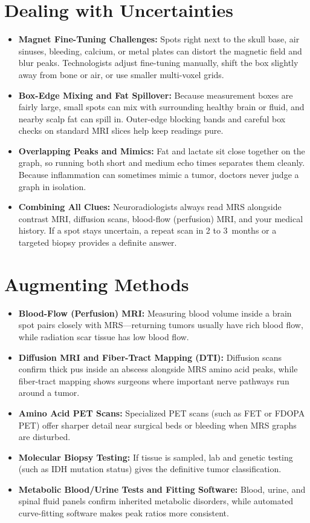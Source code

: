 \section{Dealing with Uncertainties}
\begin{itemize}
\item \textbf{Magnet Fine-Tuning Challenges:} Spots right next to the skull base, air sinuses, bleeding, calcium, or metal plates can distort the magnetic field and blur peaks. Technologists adjust fine-tuning manually, shift the box slightly away from bone or air, or use smaller multi-voxel grids.
\item \textbf{Box-Edge Mixing and Fat Spillover:} Because measurement boxes are fairly large, small spots can mix with surrounding healthy brain or fluid, and nearby scalp fat can spill in. Outer-edge blocking bands and careful box checks on standard MRI slices help keep readings pure.
\item \textbf{Overlapping Peaks and Mimics:} Fat and lactate sit close together on the graph, so running both short and medium echo times separates them cleanly. Because inflammation can sometimes mimic a tumor, doctors never judge a graph in isolation.
\item \textbf{Combining All Clues:} Neuroradiologists always read MRS alongside contrast MRI, diffusion scans, blood-flow (perfusion) MRI, and your medical history. If a spot stays uncertain, a repeat scan in 2 to 3~months or a targeted biopsy provides a definite answer.
\end{itemize}

\section{Augmenting Methods}
\begin{itemize}
\item \textbf{Blood-Flow (Perfusion) MRI:} Measuring blood volume inside a brain spot pairs closely with MRS---returning tumors usually have rich blood flow, while radiation scar tissue has low blood flow.
\item \textbf{Diffusion MRI and Fiber-Tract Mapping (DTI):} Diffusion scans confirm thick pus inside an abscess alongside MRS amino acid peaks, while fiber-tract mapping shows surgeons where important nerve pathways run around a tumor.
\item \textbf{Amino Acid PET Scans:} Specialized PET scans (such as FET or FDOPA PET) offer sharper detail near surgical beds or bleeding when MRS graphs are disturbed.
\item \textbf{Molecular Biopsy Testing:} If tissue is sampled, lab and genetic testing (such as IDH mutation status) gives the definitive tumor classification.
\item \textbf{Metabolic Blood/Urine Tests and Fitting Software:} Blood, urine, and spinal fluid panels confirm inherited metabolic disorders, while automated curve-fitting software makes peak ratios more consistent.
\end{itemize}

